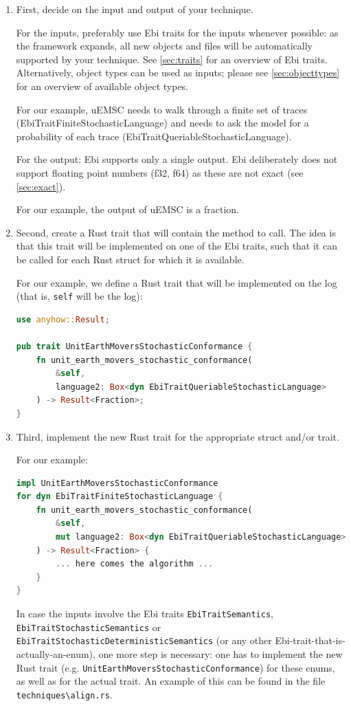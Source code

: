 \documentclass{book}
\begin{document}
			\begin{enumerate}
				\item First, decide on the input and output of your technique.
				
				For the inputs, preferably use Ebi traits for the inputs whenever possible: as the framework expands, all new objects and files will be automatically supported by your technique.
				See \cref{sec:traits} for an overview of Ebi traits.
				Alternatively, object types can be used as inputs; please see \cref{sec:objecttypes} for an overview of available object types.
				
				For our example, uEMSC needs to walk through a finite set of traces (EbiTraitFiniteStochasticLanguage) and needs to ask the model for a probability of each trace (EbiTraitQueriableStochasticLanguage).
				
				For the output: Ebi supports only a single output.
				Ebi deliberately does not support floating point numbers (f32, f64) as these are not exact (see \cref{sec:exact}).
				
				For our example, the output of uEMSC is a fraction.
				
				\item Second, create a Rust trait that will contain the method to call.
				The idea is that this trait will be implemented on one of the Ebi traits, such that it can be called for each Rust struct for which it is available.
				
				For our example, we define a Rust trait that will be implemented on the log (that is, \texttt{self} will be the log):
\begin{lstlisting}[language=Rust, style=boxed]
use anyhow::Result;

pub trait UnitEarthMoversStochasticConformance {
    fn unit_earth_movers_stochastic_conformance(
    	&self, 
    	language2: Box<dyn EbiTraitQueriableStochasticLanguage>
    ) -> Result<Fraction>;
}
\end{lstlisting}				
				
				 \item Third, implement the new Rust trait for the appropriate struct and/or trait.
				 
				 For our example:
\begin{lstlisting}[language=Rust, style=boxed]
impl UnitEarthMoversStochasticConformance 
for dyn EbiTraitFiniteStochasticLanguage {
    fn unit_earth_movers_stochastic_conformance(
    	&self, 
    	mut language2: Box<dyn EbiTraitQueriableStochasticLanguage>
    ) -> Result<Fraction> {   
    	... here comes the algorithm ...
    }
}
\end{lstlisting}

				In case the inputs involve the Ebi traits \texttt{EbiTraitSemantics}, \texttt{EbiTraitStochasticSemantics} or \texttt{EbiTraitStochasticDeterministicSemantics} (or any other Ebi-trait-that-is-actually-an-enum), one more step is necessary: one has to implement the new Rust trait (e.g. \texttt{UnitEarthMoversStochasticConformance}) for these enums, as well as for the actual trait.
				An example of this can be found in the file \verb=techniques\align.rs=.
			\end{enumerate}
			
\end{document}
